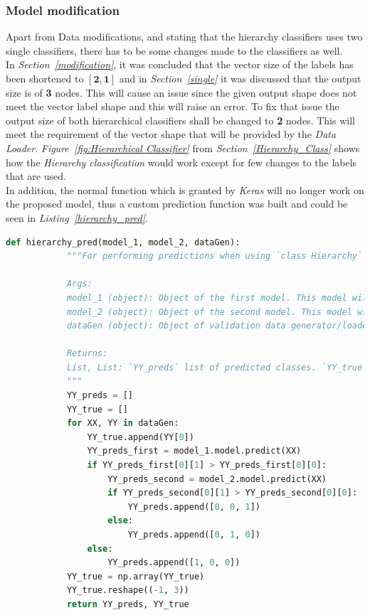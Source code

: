 \documentclass[12pt]{extarticle}
\begin{document}
	\subsubsection{Model modification}
	Apart from Data modifications, and stating that the hierarchy classifiers uses two single classifiers, there has to be some changes made to the classifiers as well.\\
	In \emph{Section~\ref{modification}}, it was concluded that the vector size of the labels has been shortened to $\bm{[2, 1]}$ and in \emph{Section~\ref{single}} it was discussed that the output size is of \textbf{3} nodes. This will cause an issue since the given output shape does not meet the vector label shape and this will raise an error. To fix that issue the output size of both hierarchical classifiers shall be changed to \textbf{2} nodes. This will meet the requirement of the vector shape that will be provided by the \emph{Data Loader}. \emph{Figure~\ref{fig:Hierarchical Classifier}} from \emph{Section~\ref{Hierarchy_Class}} shows how the \emph{Hierarchy classification} would work except for few changes to the labels that are used.\\
	In addition, the normal function which is granted by \emph{Keras} will no longer work on the proposed model, thus a custom prediction function was built and could be seen in \emph{Listing~\ref{hierarchy_pred}}.\newpage
	\begin{lstlisting}[language=Python, caption=Hierarchy prediction function, label=hierarchy_pred]
		def hierarchy_pred(model_1, model_2, dataGen):
			"""For performing predictions when using `class Hierarchy` model
		
			Args:
			model_1 (object): Object of the first model. This model will be responsible to classify between `Normal` and `Tumor`
			model_2 (object): Object of the second model. This model will be responsible to classify between `Benign` and `Cancer`
			dataGen (object): Object of validation data generator/loader
		
			Returns:
			List, List: `YY_preds` list of predicted classes. `YY_true` list of true classes
			"""
			YY_preds = []
			YY_true = []
			for XX, YY in dataGen:
				YY_true.append(YY[0])
				YY_preds_first = model_1.model.predict(XX)
				if YY_preds_first[0][1] > YY_preds_first[0][0]:
					YY_preds_second = model_2.model.predict(XX)
					if YY_preds_second[0][1] > YY_preds_second[0][0]:
						YY_preds.append([0, 0, 1])
					else:
						YY_preds.append([0, 1, 0])
				else:
					YY_preds.append([1, 0, 0])
			YY_true = np.array(YY_true)
			YY_true.reshape((-1, 3))
			return YY_preds, YY_true
	\end{lstlisting}
	\newpage
\end{document}
